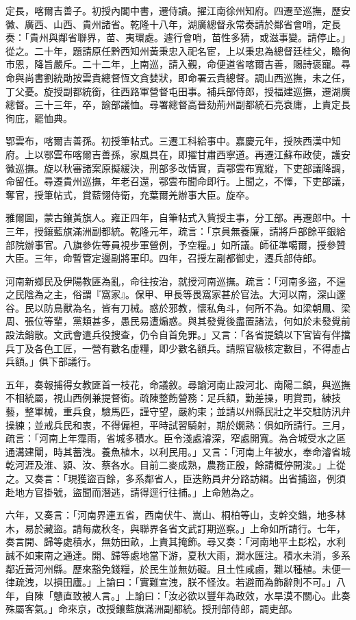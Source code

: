 \begin{pinyinscope}
定長，喀爾吉善子。初授內閣中書，遷侍讀。擢江南徐州知府。四遷至巡撫，歷安徽、廣西、山西、貴州諸省。乾隆十八年，湖廣總督永常奏請於鄰省會哨，定長奏：「貴州與鄰省聯界，苗、夷環處。遽行會哨，苗性多猜，或滋事變。請停止。」從之。二十年，題請原任黔西知州黃秉忠入祀名宦，上以秉忠為總督廷桂父，瞻徇巿恩，降旨嚴斥。二十二年，上南巡，請入覲，命便道省喀爾吉善，賜詩褒寵。尋命與尚書劉統勛按雲貴總督恆文貪婪狀，即命署云貴總督。調山西巡撫，未之任，丁父憂。旋授副都統銜，往西路軍營督屯田事。補兵部侍郎，授福建巡撫，遷湖廣總督。三十三年，卒，諭部議恤。尋署總督高晉劾荊州副都統石亮衰庸，上責定長徇庇，罷恤典。

鄂雲布，喀爾吉善孫。初授筆帖式。三遷工科給事中。嘉慶元年，授陜西漢中知府。上以鄂雲布喀爾吉善孫，家風具在，即擢甘肅西寧道。再遷江蘇布政使，護安徽巡撫。旋以秋審諸案原擬緩決，刑部多改情實，責鄂雲布寬縱，下吏部議降調，命留任。尋遷貴州巡撫，年老召還，鄂雲布聞命即行。上聞之，不懌，下吏部議，奪官，授筆帖式，賞藍翎侍衛，充葉爾羌辦事大臣。旋卒。

雅爾圖，蒙古鑲黃旗人。雍正四年，自筆帖式入貲授主事，分工部。再遷郎中。十三年，授鑲藍旗滿洲副都統。乾隆元年，疏言：「京員無養廉，請將戶部餘平銀給部院辦事官。八旗參佐等員視步軍營例，予空糧。」如所議。師征準噶爾，授參贊大臣。三年，命暫管定邊副將軍印。四年，召授左副都御史，遷兵部侍郎。

河南新鄉民及伊陽教匪為亂，命往按治，就授河南巡撫。疏言：「河南多盜，不逞之民陰為之主，俗謂『窩家』。保甲、甲長等畏窩家甚於官法。大河以南，深山邃谷。民以防鳥獸為名，皆有刀械。惑於邪教，懷私角斗，何所不為。如梁朝鳳、梁周、張位等輩，黨類甚多，愚民易遭煽惑。與其發覺後盡置諸法，何如於未發覺前設法銷散。文武會遣兵役搜查，仍令自首免罪。」又言：「各省提鎮以下官皆有伴擋兵丁及各色工匠，一營有數名虛糧，即少數名額兵。請照官級核定數目，不得虛占兵額。」俱下部議行。

五年，奏報捕得女教匪首一枝花，命議敘。尋諭河南止設河北、南陽二鎮，與巡撫不相統屬，視山西例兼提督銜。疏陳整飭營務：足兵額，勤差操，明賞罰，練技藝，整軍械，重兵食，驗馬匹，謹守望，嚴約束；並請以州縣民壯之半交駐防汛弁操練；並戒兵民和衷，不得偏袒，平時試習騎射，期於嫺熟：俱如所請行。三月，疏言：「河南上年霪雨，省城多積水。臣令淺處濬深，窄處開寬。為合城受水之區通溝建閘，時其蓄洩。養魚植木，以利民用。」又言：「河南上年被水，奉命濬省城乾河涯及淮、潁、汝、蔡各水。目前二麥成熟，農務正殷，餘請概停開浚。」上從之。又奏言：「現獲盜百餘，多系鄰省人，臣迭飭員弁分路訪緝。出省捕盜，例須赴地方官掛號，盜聞而潛逃，請得逕行往捕。」上命勉為之。

六年，又奏言：「河南界連五省，西南伏牛、嵩山、桐柏等山，支幹交錯，地多林木，易於藏盜。請每歲秋冬，與聯界各省文武訂期巡察。」上命如所請行。七年，奏言開、歸等處積水，無妨田畝，上責其掩飾。尋又奏：「河南地平土髟松，水利誠不如東南之通達。開、歸等處地當下游，夏秋大雨，澗水匯注。積水未消，多系鄰近黃河州縣。歷來豁免錢糧，於民生並無妨礙。且土性咸鹵，難以種植。未便一律疏洩，以損田廬。」上諭曰：「實難宣洩，朕不怪汝。若避而為飾辭則不可。」八年，自陳「戇直致被人言。」上諭曰：「汝必欲以豐年為政效，水旱漠不關心。此奏殊屬客氣。」命來京，改授鑲藍旗滿洲副都統。授刑部侍郎，調吏部。


\end{pinyinscope}

